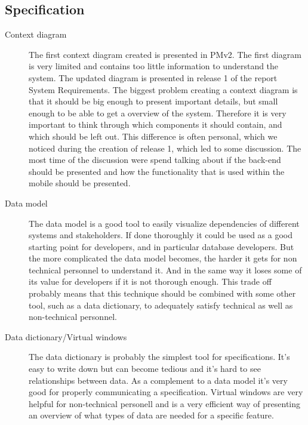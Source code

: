 \documentclass[10pt,a4paper]{article}
\begin{document}
\subsection{Specification}
\begin{description}
\item[Context diagram] The first context diagram created is presented in PMv2. The first diagram is very limited and contains too little information to understand the system. The updated diagram is presented in release 1 of the report System Requirements. The biggest problem creating a context diagram is that it should be big enough to present important details, but small enough to be able to get a overview of the system. Therefore it is very important to think through which components it should contain, and which should be left out. This difference is often personal, which we noticed during the creation of release 1, which led to some discussion. The most time of the discussion were spend talking about if the back-end should be presented and how the functionality that is used within the mobile should be presented. 

\item[Data model] The data model is a good tool to easily visualize dependencies of different systems and stakeholders. If done  thoroughly it could be used as a good starting point for developers, and in particular database developers. But the more complicated the data model becomes, the harder it gets for non technical personnel to understand it. And in the same way it loses some of its value for developers if it is not thorough enough. This trade off probably means that this technique should be combined with some other tool, such as a data dictionary, to adequately satisfy technical as well as non-technical personnel. 

\item[Data dictionary/Virtual windows] The data dictionary is probably the simplest tool for specifications. It's easy to write down but can become tedious and it's hard to see relationships between data. As a complement to a data model it's very good for properly communicating a specification. Virtual windows are very helpful for non-technical personell and is a very efficient way of presenting an overview of what types of data are needed for a specific feature. 
\end{description}




\end{document}
